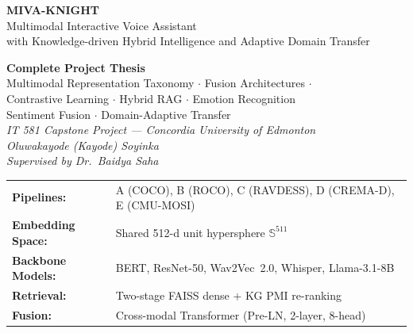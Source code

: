 \documentclass[12pt,a4paper]{article}
\theoremstyle{definition}
\theoremstyle{plain}
\theoremstyle{remark}
\newcommand{\Sph}{\mathbb{S}}
\begin{document}
\begin{titlepage}

\vspace*{2.8cm}
{\color{white}\fontsize{32}{38}\selectfont\bfseries\hspace{1.2cm}MIVA-KNIGHT}\\[0.4cm]
{\color{white!85}\fontsize{18}{22}\selectfont\hspace{1.2cm}Multimodal Interactive Voice Assistant}\\[0.15cm]
{\color{white!75}\fontsize{15}{19}\selectfont\hspace{1.2cm}with Knowledge-driven Hybrid Intelligence and Adaptive Domain Transfer}

\vspace{1.5cm}
\begin{center}
\begin{tcolorbox}[width=0.88\textwidth,colback=white,colframe=NavyBlue,arc=6pt,boxrule=1.5pt]
\centering
\textbf{Complete Project Thesis}\\[6pt]
Multimodal Representation Taxonomy $\cdot$ Fusion Architectures $\cdot$\\
Contrastive Learning $\cdot$ Hybrid RAG $\cdot$ Emotion Recognition\\
Sentiment Fusion $\cdot$ Domain-Adaptive Transfer\\[8pt]
\small\textit{IT 581 Capstone Project — Concordia University of Edmonton}\\
\textit{Oluwakayode (Kayode) Soyinka}\\[4pt]
\textit{Supervised by Dr.\ Baidya Saha}
\end{tcolorbox}
\end{center}

\vfill
\begin{center}
\begin{tabular}{ll}
\textbf{Pipelines:} & A (COCO), B (ROCO), C (RAVDESS), D (CREMA-D), E (CMU-MOSI) \\
\textbf{Embedding Space:} & Shared 512-d unit hypersphere $\Sph^{511}$ \\
\textbf{Backbone Models:} & BERT, ResNet-50, Wav2Vec~2.0, Whisper, Llama-3.1-8B \\
\textbf{Retrieval:} & Two-stage FAISS dense + KG PMI re-ranking \\
\textbf{Fusion:} & Cross-modal Transformer (Pre-LN, 2-layer, 8-head) \\
\end{tabular}
\end{center}
\vspace{1.5cm}
\end{titlepage}
\end{document}
